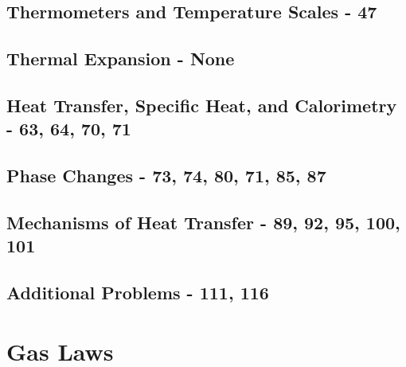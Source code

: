 \documentclass[12pt, letterpaper, twoside]{article}
\begin{document}
  \setcounter{subsection}{1}
  \subsection{Thermometers and Temperature Scales - 47}
  
  \subsection{Thermal Expansion - None}
  
  \subsection{Heat Transfer, Specific Heat, and Calorimetry - 63, 64, 70, 71}
  
  \subsection{Phase Changes - 73, 74, 80, 71, 85, 87}
  
  \subsection{Mechanisms of Heat Transfer - 89, 92, 95, 100, 101}
  
  \subsection*{Additional Problems - 111, 116}
  
\section{Gas Laws}
\end{document}
